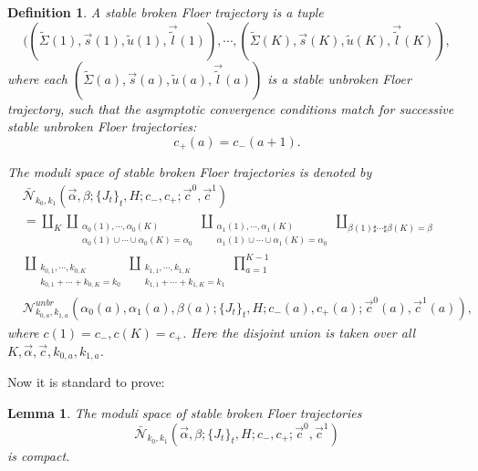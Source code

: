 \documentclass{amsart}
\newtheorem{definition}[theorem]{Definition}
\newtheorem{lemma}[theorem]{Lemma}
\numberwithin{equation}{section}
\numberwithin{figure}{section}
\begin{document}
\begin{definition}
	A stable broken Floer trajectory is a tuple
\begin{equation*}
((\tilde{\Sigma}(1), \vec{s}(1), \tilde{u}(1), \vec{\tilde{l}}(1)), \cdots, (\tilde{\Sigma}(K), \vec{s}(K), \tilde{u}(K), \vec{\tilde{l}}(K)),
\end{equation*}
where each $(\tilde{\Sigma}(a), \vec{s}(a), \tilde{u}(a), \vec{\tilde{l}}(a))$ is a stable unbroken Floer trajectory, such that the asymptotic convergence conditions match for successive stable unbroken Floer trajectories:
\begin{equation}
c_{+}(a) = c_{-}(a+1).
\end{equation} \par
	The moduli space of stable broken Floer trajectories is denoted by
\begin{equation}
\begin{split}
&\bar{\mathcal{N}}_{k_{0}, k_{1}}(\vec{\alpha}, \beta; \{J_{t}\}_{t}, H; c_{-}, c_{+}; \vec{c}^{0}, \vec{c}^{1})\\
&= \coprod_{K} \coprod_{\substack{\alpha_{0}(1), \cdots, \alpha_{0}(K)\\\alpha_{0}(1) \cup \cdots \cup \alpha_{0}(K) = \alpha_{0}}} \coprod_{\substack{\alpha_{1}(1), \cdots, \alpha_{1}(K)\\\alpha_{1}(1) \cup \cdots \cup \alpha_{1}(K) = \alpha_{0}}} \coprod_{\beta(1) \sharp \cdots \sharp \beta(K) = \beta}\\
&\coprod_{\substack{k_{0, 1}, \cdots, k_{0, K}\\k_{0, 1} + \cdots + k_{0, K} = k_{0}}} \coprod_{\substack{k_{1, 1}, \cdots, k_{1, K}\\k_{1, 1} + \cdots + k_{1, K} = k_{1}}} \prod_{a=1}^{K-1}\\
&\mathcal{N}^{unbr}_{k_{0, a}, k_{1, a}}(\alpha_{0}(a), \alpha_{1}(a), \beta(a); \{J_{t}\}_{t}, H; c_{-}(a), c_{+}(a); \vec{c}^{0}(a), \vec{c}^{1}(a)),
\end{split}
\end{equation}
where $c(1) = c_{-}, c(K) = c_{+}$. Here the disjoint union is taken over all $K, \vec{\alpha}, \vec{c}, k_{0, a}, k_{1, a}$. 

\end{definition}

	Now it is standard to prove: \par

\begin{lemma}
	The moduli space of stable broken Floer trajectories
\begin{equation*}
\bar{\mathcal{N}}_{k_{0}, k_{1}}(\vec{\alpha}, \beta; \{J_{t}\}_{t}, H; c_{-}, c_{+}; \vec{c}^{0}, \vec{c}^{1})
\end{equation*}
is compact.
\end{lemma}
\end{document}
